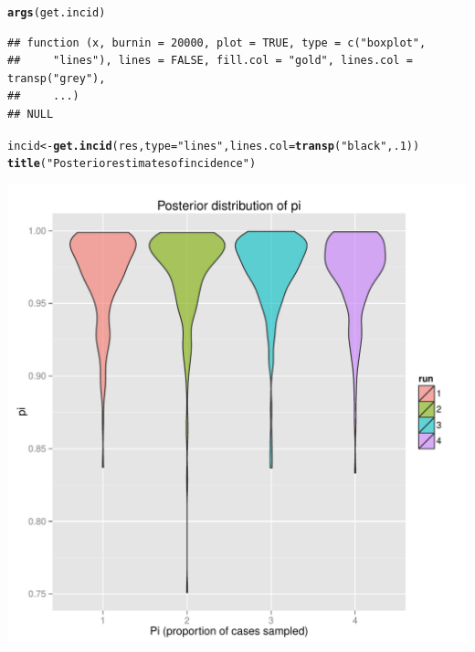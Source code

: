 \documentclass{article}\usepackage[]{graphicx}\usepackage[]{color}
\makeatletter
\newcommand{\hlnum}[1]{\textcolor[rgb]{0.686,0.059,0.569}{#1}}%
\newcommand{\hlstr}[1]{\textcolor[rgb]{0.192,0.494,0.8}{#1}}%
\newcommand{\hlstd}[1]{\textcolor[rgb]{0.345,0.345,0.345}{#1}}%
\newcommand{\hlkwb}[1]{\textcolor[rgb]{0.69,0.353,0.396}{#1}}%
\newcommand{\hlkwc}[1]{\textcolor[rgb]{0.333,0.667,0.333}{#1}}%
\newcommand{\hlkwd}[1]{\textcolor[rgb]{0.737,0.353,0.396}{\textbf{#1}}}%
\newenvironment{kframe}{%
 \def\at@end@of@kframe{}%
 \ifinner\ifhmode%
  \def\at@end@of@kframe{\end{minipage}}%
  \begin{minipage}{\columnwidth}%
 \fi\fi%
 \def\FrameCommand##1{\hskip\@totalleftmargin \hskip-\fboxsep
 \colorbox{shadecolor}{##1}\hskip-\fboxsep
     \hskip-\linewidth \hskip-\@totalleftmargin \hskip\columnwidth}%
 \MakeFramed {\advance\hsize-\width
   \@totalleftmargin\z@ \linewidth\hsize
   \@setminipage}}%
 {\par\unskip\endMakeFramed%
 \at@end@of@kframe}
\newenvironment{knitrout}{}{} %
\makeatother
\begin{document}
\begin{knitrout}
\color{fgcolor}\begin{kframe}
\begin{alltt}
\hlkwd{args}\hlstd{(get.incid)}
\end{alltt}
\begin{verbatim}
## function (x, burnin = 20000, plot = TRUE, type = c("boxplot", 
##     "lines"), lines = FALSE, fill.col = "gold", lines.col = transp("grey"), 
##     ...) 
## NULL
\end{verbatim}
\begin{alltt}
\hlstd{incid} \hlkwb{<-} \hlkwd{get.incid}\hlstd{(res,} \hlkwc{type}\hlstd{=}\hlstr{"lines"}\hlstd{,}\hlkwc{lines.col}\hlstd{=}\hlkwd{transp}\hlstd{(}\hlstr{"black"}\hlstd{,}\hlnum{.1}\hlstd{))}
\hlkwd{title}\hlstd{(}\hlstr{"Posterior estimates of incidence"}\hlstd{)}
\end{alltt}
\end{kframe}

{\centering \includegraphics[width=.6\textwidth]{figs/unnamed-chunk-41} 

}



\end{knitrout}
\end{document}
